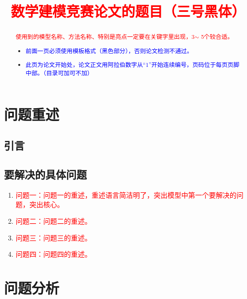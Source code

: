 \documentclass[12pt,a4paper]{mcmthesis}
\title{\textcolor{red}{数学建模竞赛论文的题目（三号黑体）}}
\date{}
\begin{document}
\begin{abstract}


\begin{keywords}
{\song\xiaosihao
\textcolor{red}{使用到的模型名称、方法名称、特别是亮点一定要在关键字里出现，3$\sim$ 5个较合适。}}
\end{keywords}

\begin{itemize}
  \item \textcolor{blue}{前面一页必须使用模板格式（黑色部分），否则论文检测不通过。}
  \item \textcolor{blue}{此页为论文开始处，论文正文用阿拉伯数字从“1”开始连续编号，页码位于每页页脚中部。（目录可加可不加）}
\end{itemize}

\end{abstract}
\maketitle
\renewcommand{\contentsname}{\centerline{\sanhao\bfseries\HEI 目\quad 录}}
\tableofcontents

\newpage
\setcounter{page}{1}
\section{问题重述}
\subsection{引言}


\subsection{要解决的具体问题}
\begin{enumerate}
  \item \textcolor{red}{问题一：问题一的重述，重述语言简洁明了，突出模型中第一个要解决的问题，突出核心。}
  \item \textcolor{red}{问题二：问题二的重述。}
  \item \textcolor{red}{问题三：问题三的重述。}
  \item \textcolor{red}{问题四：问题四的重述。}
\end{enumerate}

\section{问题分析}
\end{document}

